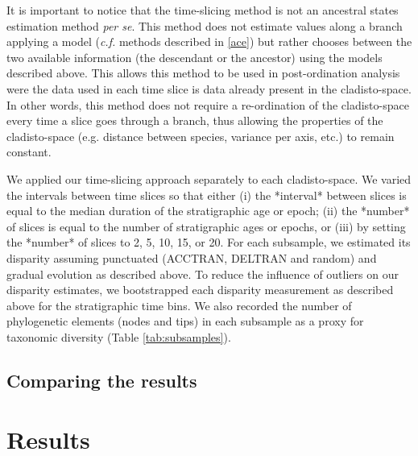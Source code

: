 \documentclass[12pt,a4paper]{article}
\begin{document}
It is important to notice that the time-slicing method is not an ancestral states estimation method \textit{per se}.
This method does not estimate values along a branch applying a model (\textit{c.f.} methods described in \ref{ace}) but rather chooses between the two available information (the descendant or the ancestor) using the models described above.
This allows this method to be used in post-ordination analysis were the data used in each time slice is data already present in the cladisto-space.
In other words, this method does not require a re-ordination of the cladisto-space every time a slice goes through a branch, thus allowing the properties of the cladisto-space (e.g. distance between species, variance per axis, etc.) to remain constant.


We applied our time-slicing approach separately to each cladisto-space.
We varied the intervals between time slices so that either (i) the *interval* between slices is equal to the median duration of the stratigraphic age or epoch; (ii) the *number* of slices is equal to the number of stratigraphic ages or epochs, or (iii) by setting the *number* of slices to 2, 5, 10, 15, or 20.
For each subsample, we estimated its disparity assuming punctuated (ACCTRAN, DELTRAN and random) and gradual evolution as described above. %
To reduce the influence of outliers on our disparity estimates, we bootstrapped each disparity measurement as described above for the stratigraphic time bins. 
We also recorded the number of phylogenetic elements (nodes and tips) in each subsample as a proxy for taxonomic diversity (Table \ref{tab:subsamples}).

\subsection{Comparing the results}


	
\section{Results} 



	
\end{document}
